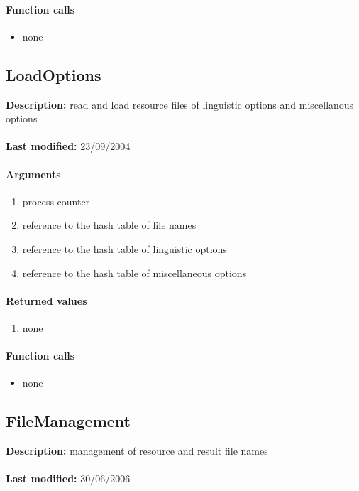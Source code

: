\paragraph{Function calls}
\begin{itemize}
\item none
\end{itemize}

\subsection{LoadOptions}
\textbf{Description:} read and load resource files of linguistic options and miscellanous options\\
\\\textbf{Last modified:} 23/09/2004

\paragraph{Arguments}
\begin{enumerate}
\item process counter
\item reference to the hash table of file names
\item reference to the hash table of linguistic options
\item reference to the hash table of miscellaneous options
\end{enumerate}

\paragraph{Returned values}
\begin{enumerate}
\item none
\end{enumerate}

\paragraph{Function calls}
\begin{itemize}
\item none
\end{itemize}

\subsection{FileManagement}
\textbf{Description:} management of resource and result file names\\
\\\textbf{Last modified:} 30/06/2006

